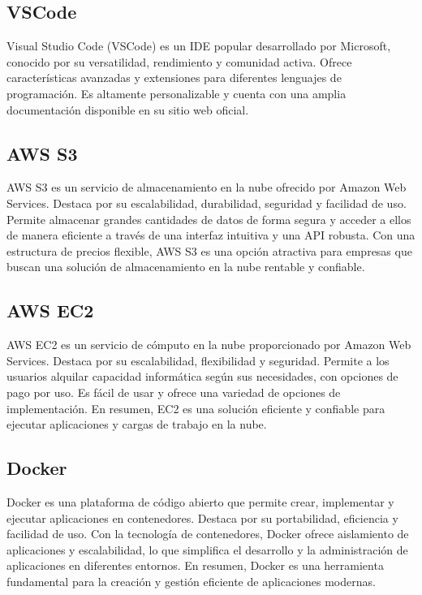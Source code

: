 \subsection{VSCode}
Visual Studio Code (VSCode) es un IDE popular desarrollado por Microsoft, conocido por su versatilidad, rendimiento y comunidad activa.
 Ofrece características avanzadas y extensiones para diferentes lenguajes de programación. Es altamente personalizable y cuenta con una 
 amplia documentación disponible en su sitio web oficial.

\subsection{AWS S3}
AWS S3 es un servicio de almacenamiento en la nube ofrecido por Amazon Web Services. Destaca por su escalabilidad, durabilidad, seguridad y 
facilidad de uso. Permite almacenar grandes cantidades de datos de forma segura y acceder a ellos de manera eficiente a través de una interfaz 
intuitiva y una API robusta. Con una estructura de precios flexible, AWS S3 es una opción atractiva para empresas que buscan una solución de 
almacenamiento en la nube rentable y confiable.

\subsection{AWS EC2}
AWS EC2 es un servicio de cómputo en la nube proporcionado por Amazon Web Services. Destaca por su escalabilidad, flexibilidad y seguridad. 
Permite a los usuarios alquilar capacidad informática según sus necesidades, con opciones de pago por uso. Es fácil de usar y ofrece una variedad 
de opciones de implementación. En resumen, EC2 es una solución eficiente y confiable para ejecutar aplicaciones y cargas de trabajo en la nube.

\subsection{Docker}
Docker\cite{Docker} es una plataforma de código abierto que permite crear, implementar y ejecutar aplicaciones en contenedores. Destaca por su portabilidad, 
eficiencia y facilidad de uso. Con la tecnología de contenedores, Docker ofrece aislamiento de aplicaciones y escalabilidad, lo que simplifica el 
desarrollo y la administración de aplicaciones en diferentes entornos. En resumen, Docker es una herramienta fundamental para la creación y gestión 
eficiente de aplicaciones modernas.


